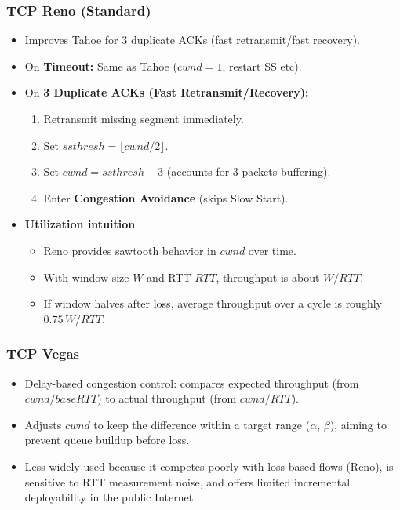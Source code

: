 \subsubsection{TCP Reno (Standard)}
\begin{itemize}
	\item Improves Tahoe for 3 duplicate ACKs (fast retransmit/fast recovery).
    \item On \textbf{Timeout:} Same as Tahoe ($cwnd=1$, restart SS etc).
    \item On \textbf{3 Duplicate ACKs (Fast Retransmit/Recovery):}
    \begin{enumerate}
        \item Retransmit missing segment immediately.
        \item Set $ssthresh = \lfloor cwnd/2 \rfloor$.
        \item Set $cwnd = ssthresh + 3$ (accounts for 3 packets buffering).
        \item Enter \textbf{Congestion Avoidance} (skips Slow Start).
    \end{enumerate}
	\item \textbf{Utilization intuition}
	\begin{itemize}
		\item Reno provides sawtooth behavior in $cwnd$ over time.
		\item With window size $W$ and RTT $RTT$, throughput is about $W/RTT$.
		\item If window halves after loss, average throughput over a cycle is roughly $0.75\,W/RTT$.
	\end{itemize}
\end{itemize}

\subsubsection{TCP Vegas}
\begin{itemize}
	\item Delay-based congestion control: compares expected throughput (from $cwnd/baseRTT$) to actual throughput (from $cwnd/RTT$).
	\item Adjusts $cwnd$ to keep the difference within a target range (\textbf{$\alpha$}, \textbf{$\beta$}), aiming to prevent queue buildup before loss.
	\item Less widely used because it competes poorly with loss-based flows (Reno), is sensitive to RTT measurement noise, and offers limited incremental deployability in the public Internet.
\end{itemize}

